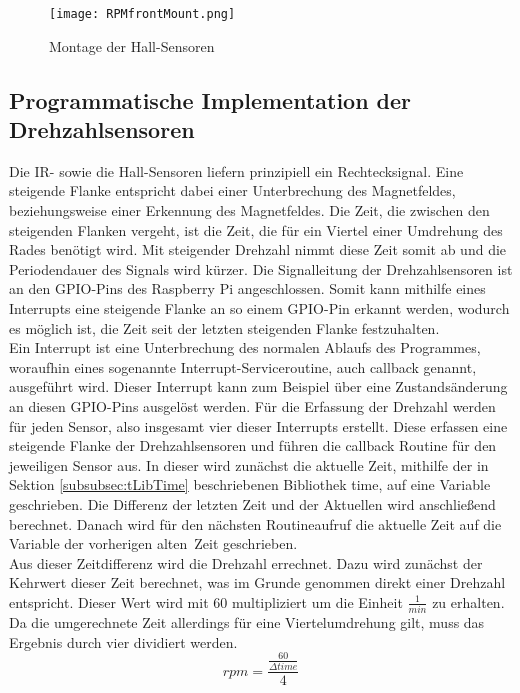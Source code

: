 \begin{figure}[h]
\centering
\texttt{[image: RPMfrontMount.png]}
\caption{Montage der Hall-Sensoren}
\label{fig:RPMfrontMount}
\end{figure}

\subsection{Programmatische Implementation der Drehzahlsensoren}
\label{subsec:RPMprogram}
Die \ac{IR}- sowie die Hall-Sensoren liefern prinzipiell ein Rechtecksignal. Eine steigende Flanke entspricht dabei einer Unterbrechung des Magnetfeldes, beziehungsweise einer Erkennung des Magnetfeldes. Die Zeit, die zwischen den steigenden Flanken vergeht, ist  die Zeit, die für ein Viertel einer Umdrehung des Rades benötigt wird. Mit steigender Drehzahl nimmt diese Zeit somit ab und die Periodendauer des Signals wird kürzer. Die Signalleitung der Drehzahlsensoren ist an den \ac{GPIO}-Pins des Raspberry Pi angeschlossen. Somit kann mithilfe eines Interrupts eine steigende Flanke an so einem \ac{GPIO}-Pin erkannt werden, wodurch es möglich ist, die Zeit seit der letzten steigenden Flanke festzuhalten.\\
Ein Interrupt ist eine Unterbrechung des normalen Ablaufs des Programmes, woraufhin eines sogenannte Interrupt-Serviceroutine, auch callback genannt, ausgeführt wird. Dieser Interrupt kann zum Beispiel über eine Zustandsänderung an diesen \ac{GPIO}-Pins ausgelöst werden. Für die Erfassung der Drehzahl werden für jeden Sensor, also insgesamt vier dieser Interrupts erstellt. Diese erfassen eine steigende Flanke der Drehzahlsensoren und führen die callback Routine für den jeweiligen Sensor aus. In dieser wird zunächst die aktuelle Zeit, mithilfe der in Sektion \ref{subsubsec:tLibTime} beschriebenen Bibliothek time, auf eine Variable geschrieben. Die Differenz der letzten Zeit und der Aktuellen wird anschließend berechnet. Danach wird für den nächsten Routineaufruf die aktuelle Zeit auf die Variable der vorherigen \glqq alten\grqq\ Zeit geschrieben.\\
Aus dieser Zeitdifferenz wird die Drehzahl errechnet. Dazu wird zunächst der Kehrwert dieser Zeit berechnet, was im Grunde genommen direkt einer Drehzahl entspricht. Dieser Wert wird mit 60 multipliziert um die Einheit $\frac{1}{min}$ zu erhalten. Da die umgerechnete Zeit allerdings für eine Viertelumdrehung gilt, muss das Ergebnis durch vier dividiert werden.
\begin{equation}
rpm=\frac{\frac{60}{\Delta time}}{4}
\label{eqn:rpm}
\end{equation}
